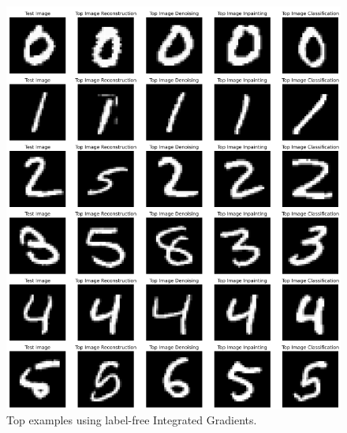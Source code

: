 \begin{figure}[H]
    \centering
    \includegraphics[width=12cm]{images/pretext_top_integrated_grads.png}
    \caption{Top examples using label-free Integrated Gradients.}
    \label{fig:topex_pretext_integrated_grads}
\end{figure}

